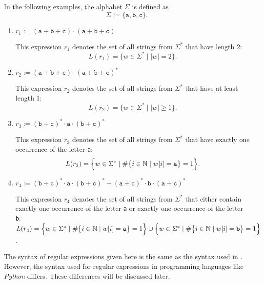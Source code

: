 \examplesEng
In the following examples, the alphabet \( \Sigma \) is defined as
\[
\Sigma := \{ \texttt{a}, \texttt{b}, \texttt{c} \}.
\]
\begin{enumerate}
\item \( r_1 := (\texttt{a} + \texttt{b} + \texttt{c}) \cdot (\texttt{a} + \texttt{b} + \texttt{c}) \)

      This expression \( r_1 \) denotes the set of all strings from $\Sigma^*$ that have length 2:
      \[
      L(r_1) = \bigl\{ w \in \Sigma^* \mid |w| = 2 \bigr\}.
      \]
      
\item \( r_2 := (\texttt{a} + \texttt{b} + \texttt{c}) \cdot (\texttt{a} + \texttt{b} + \texttt{c})^* \)

      This expression \( r_2 \) denotes the set of all strings from $\Sigma^*$ that have at least length 1:
      \[
      L(r_2) = \bigl\{ w \in \Sigma^* \mid |w| \geq 1 \bigr\}.
      \]

\item \( r_3 := (\texttt{b} + \texttt{c})^* \cdot \texttt{a} \cdot (\texttt{b} + \texttt{c})^* \)

      This expression \( r_3 \) denotes the set of all strings from $\Sigma^*$ that have exactly one occurrence of the letter \texttt{a}:
      \[
      L(r_3) = \Bigl\{ w \in \Sigma^* \mid \#\bigl\{i \in \mathbb{N} \mid w[i] = \texttt{a} \bigr\} = 1 \Bigr\}.
      \]

\item \( r_4 :=  (\texttt{b} + \texttt{c})^* \cdot \texttt{a} \cdot (\texttt{b} + \texttt{c})^* + (\texttt{a} + \texttt{c})^* \cdot \texttt{b} \cdot (\texttt{a} + \texttt{c})^* \)

      This expression \( r_4 \) denotes the set of all strings from $\Sigma^*$ that either contain exactly one
      occurrence of the letter \texttt{a} or exactly one occurrence of the letter \texttt{b}: 
      \\[0.2cm]
      \hspace*{1.3cm}
      $L(r_4) = \Bigl\{ w \in \Sigma^* \mid \#\bigl\{i \in \mathbb{N} \mid w[i] = \texttt{a} \bigr\} = 1
      \Bigr\} \cup \Bigl\{ w \in \Sigma^* \mid \#\bigl\{i \in \mathbb{N} \mid w[i] = \texttt{b} \bigr\} = 1
      \Bigr\}$.  \eox
\end{enumerate}

\remarkEng
The syntax of regular expressions given here is the same as the syntax used in \cite{hopcroft:06}. However, the
syntax used for regular expressions in programming languages like \textsl{Python} differs. These differences
will be discussed later. 
\eox
\pagebreak


